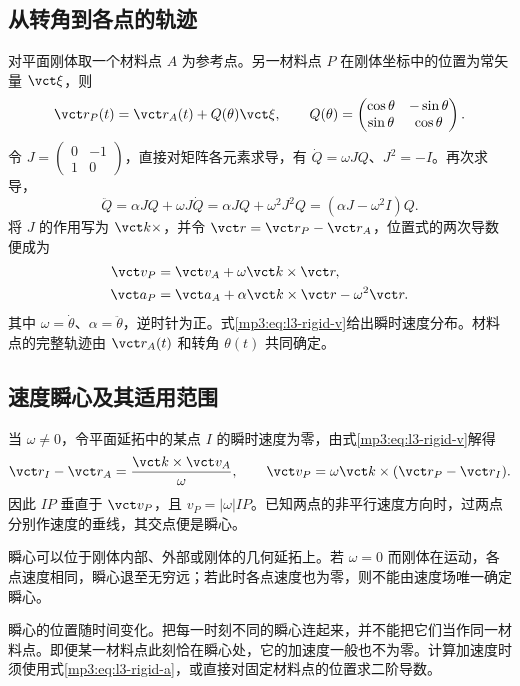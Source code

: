 \documentclass[11pt,openany,fontset=fandol]{ctexbook}
\theoremstyle{definition}\newtheorem{example}{例}[chapter]\newtheorem{exercise}{习题}[chapter]
\begin{document}
\subsection{从转角到各点的轨迹}
对平面刚体取一个材料点 $A$ 为参考点。另一材料点 $P$ 在刚体坐标中的位置为常矢量 $\vct \xi$，则
\[
\vct r_P(t)=\vct r_A(t)+Q(\theta)\vct \xi,\qquad
Q(\theta)=
\begin{pmatrix}\cos\theta&-\sin\theta\\\sin\theta&\cos\theta\end{pmatrix}.
\]
令 $J=\begin{pmatrix}0&-1\\1&0\end{pmatrix}$，直接对矩阵各元素求导，有 $\dot Q=\omega JQ$、$J^2=-I$。再次求导，
\[
\ddot Q=\alpha JQ+\omega J\dot Q
=\alpha JQ+\omega^2J^2Q=(\alpha J-\omega^2I)Q.
\]
将 $J$ 的作用写为 $\vct k\times$，并令 $\vct r=\vct r_P-\vct r_A$，位置式的两次导数便成为
\begin{align}
\vct v_P&=\vct v_A+\omega\vct k\times\vct r,\label{mp3:eq:l3-rigid-v}\\
\vct a_P&=\vct a_A+\alpha\vct k\times\vct r-\omega^2\vct r.\label{mp3:eq:l3-rigid-a}
\end{align}
其中 $\omega=\dot\theta$、$\alpha=\ddot\theta$，逆时针为正。式\eqref{mp3:eq:l3-rigid-v}给出瞬时速度分布。材料点的完整轨迹由 $\vct r_A(t)$ 和转角 $\theta(t)$ 共同确定。

\subsection{速度瞬心及其适用范围}
当 $\omega\ne0$，令平面延拓中的某点 $I$ 的瞬时速度为零，由式\eqref{mp3:eq:l3-rigid-v}解得
\[
\vct r_I-\vct r_A=\frac{\vct k\times\vct v_A}{\omega},\qquad
\vct v_P=\omega\vct k\times(\vct r_P-\vct r_I).
\]
因此 $IP$ 垂直于 $\vct v_P$，且 $v_P=|\omega|IP$。已知两点的非平行速度方向时，过两点分别作速度的垂线，其交点便是瞬心。

瞬心可以位于刚体内部、外部或刚体的几何延拓上。若 $\omega=0$ 而刚体在运动，各点速度相同，瞬心退至无穷远；若此时各点速度也为零，则不能由速度场唯一确定瞬心。

瞬心的位置随时间变化。把每一时刻不同的瞬心连起来，并不能把它们当作同一材料点。即便某一材料点此刻恰在瞬心处，它的加速度一般也不为零。计算加速度时须使用式\eqref{mp3:eq:l3-rigid-a}，或直接对固定材料点的位置求二阶导数。
\end{document}
